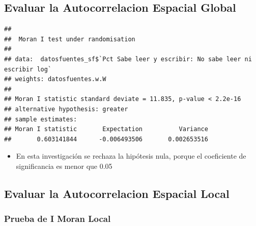 \documentclass[11pt,]{article}
\newenvironment{Shaded}{\begin{snugshade}}{\end{snugshade}}
\newcommand{\KeywordTok}[1]{\textcolor[rgb]{0.13,0.29,0.53}{\textbf{#1}}}
\newcommand{\DataTypeTok}[1]{\textcolor[rgb]{0.13,0.29,0.53}{#1}}
\newcommand{\StringTok}[1]{\textcolor[rgb]{0.31,0.60,0.02}{#1}}
\newcommand{\OperatorTok}[1]{\textcolor[rgb]{0.81,0.36,0.00}{\textbf{#1}}}
\newcommand{\NormalTok}[1]{#1}
\providecommand{\tightlist}{%
\setlength{\itemsep}{0pt}\setlength{\parskip}{0pt}}
\begin{document}
\subsection{Evaluar la Autocorrelacion Espacial
Global}\label{evaluar-la-autocorrelacion-espacial-global-1}

\begin{Shaded}
\end{Shaded}

\begin{verbatim}
## 
##  Moran I test under randomisation
## 
## data:  datosfuentes_sf$`Pct Sabe leer y escribir: No sabe leer ni escribir log`  
## weights: datosfuentes.w.W    
## 
## Moran I statistic standard deviate = 11.835, p-value < 2.2e-16
## alternative hypothesis: greater
## sample estimates:
## Moran I statistic       Expectation          Variance 
##       0.603141844      -0.006493506       0.002653516
\end{verbatim}

\begin{itemize}
\tightlist
\item
  En esta investigación se rechaza la hipótesis nula, porque el
  coeficiente de significancia es menor que 0.05
\end{itemize}

\subsection{Evaluar la Autocorrelacion Espacial
Local}\label{evaluar-la-autocorrelacion-espacial-local}

\subsubsection{Prueba de I Moran Local}\label{prueba-de-i-moran-local-1}

\begin{Shaded}
\end{Shaded}
\end{document}
